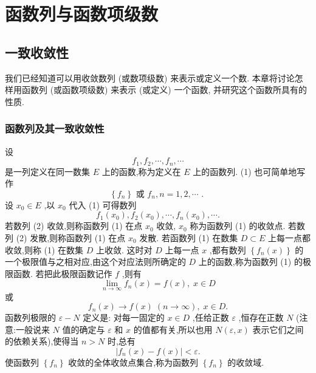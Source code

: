 \chapter{函数列与函数项级数}

\section{一致收敛性}

我们已经知道可以用收敛数列 (或数项级数) 来表示或定义一个数. 本章将讨论怎样用函数列 (或函数项级数) 来表示 (或定义) 一个函数, 并研究这个函数所具有的性质.

\subsection{函数列及其一致收敛性}

设
\[
{f}_{1},{f}_{2},\cdots ,{f}_{n},\cdots  \tag{1}
\]
是一列定义在同一数集 \(E\) 上的函数,称为定义在 \(E\) 上的函数列. (1) 也可简单地写作
\[
\left\{  {f}_{n}\right\}  \text{ 或 }{f}_{n},n = 1,2,\cdots \text{ . }
\]
设 \({x}_{0} \in  E\) ,以 \({x}_{0}\) 代入 (1) 可得数列
\[
{f}_{1}\left( {x}_{0}\right) ,{f}_{2}\left( {x}_{0}\right) ,\cdots ,{f}_{n}\left( {x}_{0}\right) ,\cdots . \tag{2}
\]
若数列 (2) 收敛,则称函数列 (1) 在点 \({x}_{0}\) 收敛, \({x}_{0}\) 称为函数列 (1) 的收敛点. 若数列 (2) 发散,则称函数列 (1) 在点 \({x}_{0}\) 发散. 若函数列 (1) 在数集 \(D \subset  E\) 上每一点都收敛,则称 (1) 在数集 \(D\) 上收敛. 这时对 \(D\) 上每一点 \(x\) ,都有数列 \(\left\{  {{f}_{n}\left( x\right) }\right\}\) 的一个极限值与之相对应,由这个对应法则所确定的 \(D\) 上的函数,称为函数列 (1) 的极限函数. 若把此极限函数记作 \(f\) ,则有
\[
\mathop{\lim }\limits_{{n \rightarrow  \infty }}{f}_{n}\left( x\right)  = f\left( x\right) ,\;x \in  D
\]
或
\[
{f}_{n}\left( x\right)  \rightarrow  f\left( x\right) \;\left( {n \rightarrow  \infty }\right) ,\;x \in  D.
\]
函数列极限的 \(\varepsilon  - N\) 定义是: 对每一固定的 \(x \in  D\) ,任给正数 \(\varepsilon\) ,恒存在正数 \(N\) (注意:一般说来 \(N\) 值的确定与 \(\varepsilon\) 和 \(x\) 的值都有关,所以也用 \(N\left( {\varepsilon ,x}\right)\) 表示它们之间的依赖关系),使得当 \(n > N\) 时,总有
\[
\left| {{f}_{n}\left( x\right)  - f\left( x\right) }\right|  < \varepsilon .
\]
使函数列 \(\left\{  {f}_{n}\right\}\) 收敛的全体收敛点集合,称为函数列 \(\left\{  {f}_{n}\right\}\) 的收敛域.

